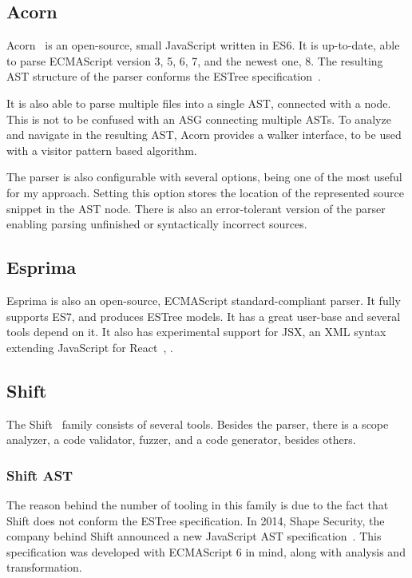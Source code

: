 \subsection{Acorn}
\label{sect:acorn}
Acorn~\cite{acorn} is an open-source, small JavaScript written in ES6. It is up-to-date, able to parse ECMAScript version 3, 5, 6, 7, and the newest one, 8. The resulting AST structure of the parser conforms the ESTree specification~\cite{estree}.

It is also able to parse multiple files into a single AST, connected with a  node. This is not to be confused with an ASG connecting multiple ASTs. To analyze and navigate in the resulting AST, Acorn provides a walker interface, to be used with a visitor pattern based algorithm.

The parser is also configurable with several options,  being one of the most useful for my approach. Setting this option stores the location of the represented source snippet in the AST node. There is also an error-tolerant version of the parser enabling parsing unfinished or syntactically incorrect sources.


\subsection{Esprima}
Esprima is also an open-source, ECMAScript standard-compliant parser. It fully supports ES7, and produces ESTree models. It has a great user-base and several tools depend on it. It also has experimental support for JSX, an XML syntax extending JavaScript for React~\cite{react}, .


\subsection{Shift}
\label{sect:shift}
The Shift~\cite{shift} family consists of several tools. Besides the parser, there is a scope analyzer, a code validator, fuzzer, and a code generator, besides others.

\subsubsection{Shift AST}
The reason behind the number of tooling in this family is due to the fact that Shift does not conform the ESTree specification. In 2014, Shape Security, the company behind Shift announced a new JavaScript AST specification~\cite{shift-spec}. This specification was developed with ECMAScript 6 in mind, along with analysis and transformation.

